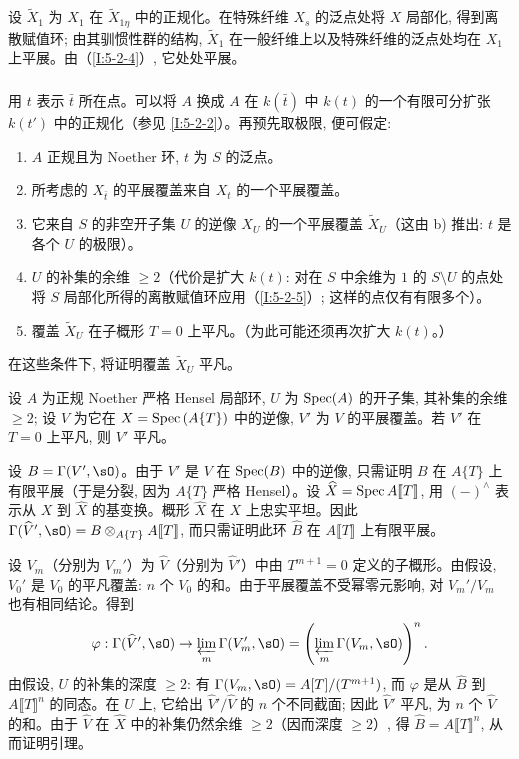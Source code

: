设 $\widetilde X_1$ 为 $X_1$ 在 $\widetilde X_{1\eta}$ 中的正规化。在特殊纤维 $X_s$ 的泛点处将 $X$ 局部化, 得到离散赋值环; 由其驯惯性群的结构, $\widetilde X_1$ 在一般纤维上以及特殊纤维的泛点处均在 $X_1$ 上平展。由（\ref{I:5-2-4}）, 它处处平展。

\subsubsection{}\label{I:5-2-6} %

用 $t$ 表示 $\bar t$ 所在点。可以将 $A$ 换成 $A$ 在 $k(\bar t)$ 中 $k(t)$ 的一个有限可分扩张 $k(t')$ 中的正规化（参见 \ref{I:5-2-2}）。再预先取极限, 便可假定:
\begin{enumerate}[\indent a)]
  \item $A$ 正规且为 Noether 环, $t$ 为 $S$ 的泛点。
  \item 所考虑的 $X_{\bar t}$ 的平展覆盖来自 $X_t$ 的一个平展覆盖。
  \item 它来自 $S$ 的非空开子集 $U$ 的逆像 $X_U$ 的一个平展覆盖 $\widetilde X_U$（这由 b) 推出: $t$ 是各个 $U$ 的极限）。
  \item $U$ 的补集的余维 $\geqslant2$（代价是扩大 $k(t)$: 对在 $S$ 中余维为 $1$ 的 $S\setminus U$ 的点处将 $S$ 局部化所得的离散赋值环应用（\ref{I:5-2-5}）; 这样的点仅有有限多个）。
  \item 覆盖 $\widetilde X_U$ 在子概形 $T=0$ 上平凡。（为此可能还须再次扩大 $k(t)$。）
\end{enumerate}

在这些条件下, 将证明覆盖 $\widetilde X_U$ 平凡。

\begin{lemma}\label{I:5-2-7} %
设 $A$ 为正规 Noether 严格 Hensel 局部环, $U$ 为 $\operatorname{Spec}(A)$ 的开子集, 其补集的余维 $\geqslant2$; 设 $V$ 为它在 $X=\operatorname{Spec}\left(A\{T\}\right)$ 中的逆像, $V'$ 为 $V$ 的平展覆盖。若 $V'$ 在 $T=0$ 上平凡, 则 $V'$ 平凡。
\end{lemma}

设 $B=\Gamma(V',\sO)$。由于 $V'$ 是 $V$ 在 $\operatorname{Spec}(B)$ 中的逆像, 只需证明 $B$ 在 $A\{T\}$ 上有限平展（于是分裂, 因为 $A\{T\}$ 严格 Hensel）。设 $\widehat X=\operatorname{Spec} A\llbracket T\rrbracket$, 用 $(-)^\wedge$ 表示从 $X$ 到 $\widehat X$ 的基变换。概形 $\widehat X$ 在 $X$ 上忠实平坦。因此 $\Gamma(\widehat V',\sO)=B\otimes_{A\{T\}}A\llbracket T\rrbracket$, 而只需证明此环 $\widehat B$ 在 $A\llbracket T\rrbracket$ 上有限平展。

设 $V_m$（分别为 $V_m'$）为 $\widehat V$（分别为 $\widehat V'$）中由 $T^{m+1}=0$ 定义的子概形。由假设, $V_0'$ 是 $V_0$ 的平凡覆盖: $n$ 个 $V_0$ 的和。由于平展覆盖不受幂零元影响, 对 $V_m'/V_m$ 也有相同结论。得到
\[
  \varphi : \Gamma(\widehat V',\sO) \to \varprojlim_m \Gamma(V_m',\sO) = \left(\varprojlim_m \Gamma(V_m,\sO)\right)^n \text{.}
\]
由假设, $U$ 的补集的深度 $\geqslant2$: 有 $\Gamma(V_m,\sO)=A[T]/(T^{m+1})$, 而 $\varphi$ 是从 $\widehat B$ 到 $A\llbracket T\rrbracket^n$ 的同态。在 $U$ 上, 它给出 $\widehat V'/\widehat V$ 的 $n$ 个不同截面; 因此 $\widehat V'$ 平凡, 为 $n$ 个 $\widehat V$ 的和。由于 $\widehat V$ 在 $\widehat X$ 中的补集仍然余维 $\geqslant2$（因而深度 $\geqslant2$）, 得 $\widehat B=A\llbracket T\rrbracket^n$, 从而证明引理。

